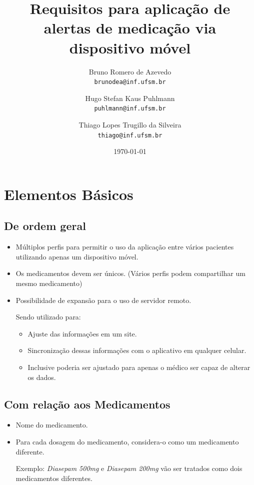 \documentclass[12pt,a4paper]{article}
\begin{document}
\title{Requisitos para aplicação de alertas de medicação via dispositivo móvel}
\author{Bruno Romero de Azevedo \\
		\texttt{brunodea@inf.ufsm.br} \and
		Hugo Stefan Kaus Puhlmann \\
		\texttt{puhlmann@inf.ufsm.br} \and
		Thiago Lopes Trugillo da Silveira \\
		\texttt{thiago@inf.ufsm.br}}
\date{\today}
\maketitle

\section{Elementos Básicos}

	\subsection{De ordem geral}
		\begin{itemize}
			\item Múltiplos perfis para permitir o uso da aplicação entre vários pacientes utilizando apenas um
				  dispositivo móvel.
			\item Os medicamentos devem ser únicos. (Vários perfis podem compartilhar um mesmo medicamento)
			\item Possibilidade de expansão para o uso de servidor remoto.
			
				  Sendo utilizado para:
				  \begin{itemize}
				  	\item Ajuste das informações em um site.
				  	\item Sincronização dessas informações com o aplicativo em qualquer celular.
				  	\item Inclusive poderia ser ajustado para apenas o médico ser capaz de alterar os dados.
				  \end{itemize}
		\end{itemize}
		
	\subsection{Com relação aos Medicamentos}
		\begin{itemize}
			\item Nome do medicamento.
			\item Para cada dosagem do medicamento, considera-o como um medicamento diferente.
				  
				  Exemplo: \emph{Diasepam 500mg} e \emph{Diasepam 200mg} vão ser tratados como dois medicamentos 
				  				  diferentes.
		\end{itemize}
		
\end{document}
